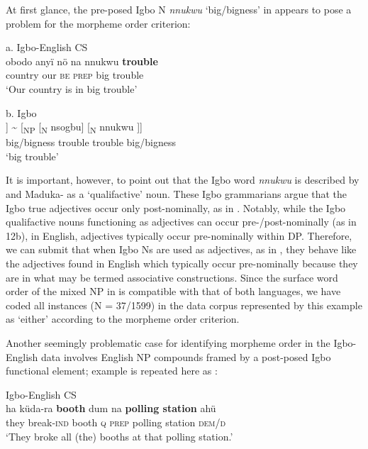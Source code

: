 \documentclass[output=paper]{langsci/langscibook}
\begin{document}
At first glance, the pre-posed Igbo N \textit{nnukwu} ‘big/bigness’ in  appears to pose a problem for the morpheme order criterion:

\ea
{a. Igbo-English CS}\\
\gll obodo  anyï  nö    na  nnukwu  \textbf{trouble}\\
     country  our    \textsc{be}\textsubscript{}  \textsc{prep} big     trouble\\
\glt ‘Our country is in big trouble’
\z

\ea
{b. Igbo} \\
\gll [\textsubscript{NP} [\textsubscript{N} nnukwu]  [\textsubscript{N} nsogbu]] {\textasciitilde} [\textsubscript{NP} [\textsubscript{N}  nsogbu] [\textsubscript{N} nnukwu\textsubscript{} ]]  \\
              big/bigness  trouble                  trouble       big/bigness    \\
\glt ‘big trouble’
\z

It is important, however, to point out that the Igbo word \textit{nnukwu} is described by \citet[47-8]{Emenanjo1978} and Maduka-\citet[237]{Durunze1990} as a ‘qualifactive’ noun. These Igbo grammarians argue that the Igbo true adjectives occur only post-nominally, as in . Notably, while the Igbo qualifactive nouns functioning as adjectives can occur pre-/post-nominally (as in 12b), in English, adjectives typically occur pre-nominally within DP. Therefore, we can submit that when Igbo Ns are used as adjectives, as in , they behave like the adjectives found in English which typically occur pre-nominally because they are in what may be termed associative constructions. Since the surface word order of the mixed NP in  is compatible with that of both languages, we have coded all instances (N = 37/1599) in the data corpus represented by this example as ‘either’ according to the morpheme order criterion. 

Another seemingly problematic case for identifying morpheme order in the Igbo-English data involves English NP compounds framed by a post-posed Igbo functional element; example  is repeated here as :

\ea
{Igbo-English CS}\\
\gll ha    küda-ra  \textbf{booth} dum   na    \textbf{polling station} ahü\\
     they break-\textsc{ind}  booth  \textsc{q}  \textsc{prep}  polling station   \textsc{dem/d}\\
\glt ‘They broke all (the) booths at that polling station.’ \textsubscript{}  
\z
\end{document}
